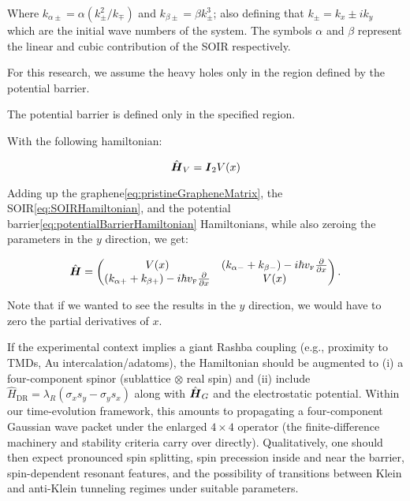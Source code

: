 \noindent Where $k_{\alpha\pm} = \alpha\left(k_{\pm}^2/k_{\mp}\right)$ and $k_{\beta\pm} = \beta k_{\pm}^3$; also defining that $k_{\pm}=k_x\pm i k_y$ which are the initial wave numbers of the system.
The symbols $\alpha$ and $\beta$ represent the linear and cubic contribution of the SOIR respectively.




For this research, we assume the heavy holes only in the region defined by the potential barrier.

The potential barrier is defined only in the specified region.

With the following hamiltonian:

\begin{equation}
    \label{eq:potentialBarrierHamiltonian}
    \hat{\mbox{\boldmath $H$}}_V=\mbox{\boldmath $I$}_2 V(x)
\end{equation}

Adding up the graphene\eqref{eq:pristineGrapheneMatrix}, the SOIR\eqref{eq:SOIRHamiltonian}, and the potential barrier\eqref{eq:potentialBarrierHamiltonian} Hamiltonians, while also zeroing the parameters in the $y$ direction, we get:

\begin{equation}
    \label{eq:hybridHamiltonian}
    \hat{\mbox{\boldmath $H$}}=
    \begin{pmatrix}
        V(x)                                                                                   & \left(k_{\alpha-}+k_{\beta-}\right)-i\hbar v_{\mbox{\tiny F}}\frac{\partial}{\partial x} \\
        \left(k_{\alpha+}+k_{\beta+}\right)-i\hbar v_{\mbox{\tiny F}}\frac{\partial}{\partial x} & V(x)
    \end{pmatrix}.
\end{equation}

Note that if we wanted to see the results in the $y$ direction, we would have to zero the partial derivatives of $x$.

If the experimental context implies a giant Rashba coupling (e.g., proximity to TMDs, Au intercalation/adatoms), the Hamiltonian should be augmented to
(i) a four-component spinor (sublattice $\otimes$ real spin) and
(ii) include $\hat{H}_{\mathrm{DR}}=\lambda_R(\sigma_x s_y-\sigma_y s_x)$ along with $\hat{\mbox{\boldmath $H$}}_G$ and the electrostatic potential.
Within our time-evolution framework, this amounts to propagating a four-component Gaussian wave packet under the enlarged $4\times 4$ operator (the finite-difference machinery and stability criteria carry over directly).
Qualitatively, one should then expect pronounced spin splitting, spin precession inside and near the barrier, spin-dependent resonant features, and the possibility of transitions between Klein and anti-Klein tunneling regimes under suitable parameters\cite{DellAnnaJPhysCondMatt2018, AvsarNatCommun2014, WangPhysRevX2016}.

